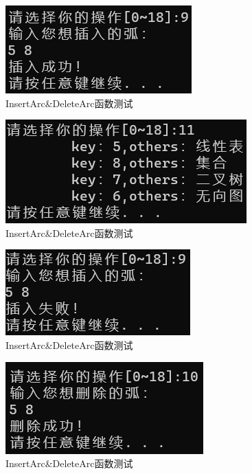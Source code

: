 \documentclass[supercite]{Experimental_Report}
\theoremstyle{definition}
\begin{document}
\begin{enumerate}
	
	\begin{figure}[H] %
		\begin{center}
			\includegraphics[width=0.5\linewidth]{images/graph/9-1.png}
			\caption{InsertArc\&DeleteArc函数测试}
			\label{fig2-8-1}
		\end{center}
	\end{figure}
	
	\begin{figure}[H] %
		\begin{center}
			\includegraphics[width=0.5\linewidth]{images/graph/9-1-11.png}
			\caption{InsertArc\&DeleteArc函数测试}
			\label{fig2-8-2}
		\end{center}
	\end{figure}
	\begin{figure}[H] %
		\begin{center}
			\includegraphics[width=0.5\linewidth]{images/graph/9-2.png}
			\caption{InsertArc\&DeleteArc函数测试}
			\label{fig2-8-3}
		\end{center}
	\end{figure}
	\begin{figure}[H] %
		\begin{center}
			\includegraphics[width=0.5\linewidth]{images/graph/10-1.png}
			\caption{InsertArc\&DeleteArc函数测试}
			\label{fig2-8-4}
		\end{center}
	\end{figure}
	

\end{enumerate}
\end{document}
